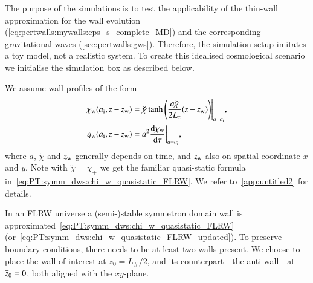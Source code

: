     The purpose of the simulations is to test the applicability of the thin-wall approximation for the wall evolution (\cref{eq:pertwalls:mywalls:eps_s_complete_MD}) and the corresponding gravitational waves (\cref{sec:pertwalls:gws}). Therefore, the simulation setup imitates a toy model, not a realistic system. To create this idealised cosmological scenario we initialise the simulation box as described below.


    We assume wall profiles of the form
    \begin{subequations}
        \begin{align}
            \chi_\mathrm{w}(a_\mathrm{i}, z- z_\mathrm{w}) &= {\breve{\chi}\tanh{{\left( \frac{a\breve{\chi}}{2L_{\text{\tiny{C}}}} (z-z\ensuremath{_\mathrm{w}})  \right)}} }\Bigg|_{a=a_\mathrm{i}}, \\
            q_\mathrm{w}(a_\mathrm{i}, z- z_\mathrm{w}) &= a^2 \dv{\chi\ensuremath{_\mathrm{w}}}{\tau}\bigg|_{a=a_\mathrm{i}},
        \end{align}
    \end{subequations}
    where $a$, $\breve{\chi}$ and $z_\mathrm{w}$ generally depends on time, and $z_\mathrm{w}$ also on spatial coordinate $x$ and $y$. Note with $\breve{\chi}=\chi_+$ we get the familiar quasi-static formula in~\cref{eq:PT:symm_dws:chi_w_quasistatic_FLRW}. We refer to~\cref{app:untitled2} for details.

    In an FLRW universe a (semi-)stable symmetron domain wall is approximated~\cref{eq:PT:symm_dws:chi_w_quasistatic_FLRW} (or~\cref{eq:PT:symm_dws:chi_w_quasistatic_FLRW_updated}). To preserve boundary conditions, there needs to be at least two walls present. We choose to place the wall of interest at $z_0 = L_\#/2$, and its counterpart---the anti-wall---at $\overline{z}_0=0$, both aligned with the $xy$-plane. %
    

